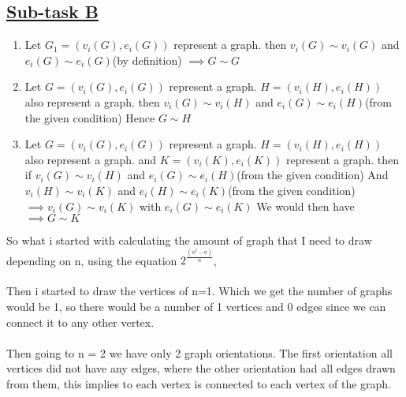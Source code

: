 \documentclass{Assignment}
\begin{document}
\subsection*{\underline{Sub-task B}}
\begin{enumerate}
	
	\item Let $G_1 = (v_i(G),e_i(G))$ represent a graph.\newline
	then $v_i(G) \sim v_i(G)$ and $e_i(G) \sim e_i(G)$(by definition)\newline
	$\implies G\sim G$  
	
	\item
	Let $G = (v_i(G),e_i(G))$ represent a graph.\newline
	$H = (v_i(H),e_i(H))$ also represent a graph.\newline
	then $v_i(G) \sim v_i(H)$ and $e_i(G) \sim e_i(H)$(from the given condition)\newline
	Hence $ G\sim H$  
	\item 	Let $G = (v_i(G),e_i(G))$ represent a graph.\newline
	$H = (v_i(H),e_i(H))$ also represent a graph.\newline
 and	$K = (v_i(K),e_i(K))$ represent a graph.\newline
	then if $v_i(G) \sim v_i(H)$ and $e_i(G) \sim e_i(H)$(from the given condition)\newline
	And  $v_i(H) \sim v_i(K)$ and $e_i(H) \sim e_i(K)$(from the given condition)\newline
	$\implies v_i(G)\sim v_i(K)$ with $e_i(G) \sim e_i(K)$ \newline
	We would then have 
	$\implies G\sim K$ 
	 \end{enumerate}
	 \newpage
	So what i started with calculating the amount of graph that I need to draw depending on n, using the equation $2^{ \frac{\left(n^2-n\right)}{n}}$,\\\\
	Then i started to draw the vertices of n=1.
	 Which we get the number of graphs would be 1, so there would be a number of 1 vertices and 0 edges since we can connect it to any other vertex.
	 \\\\Then going to n = 2 we have only 2 graph orientations. 
	 The first orientation all vertices did not have any edges, where the other orientation had all edges drawn from them, this implies to each vertex is connected to each vertex of the graph.\\\\ 
\end{document}
